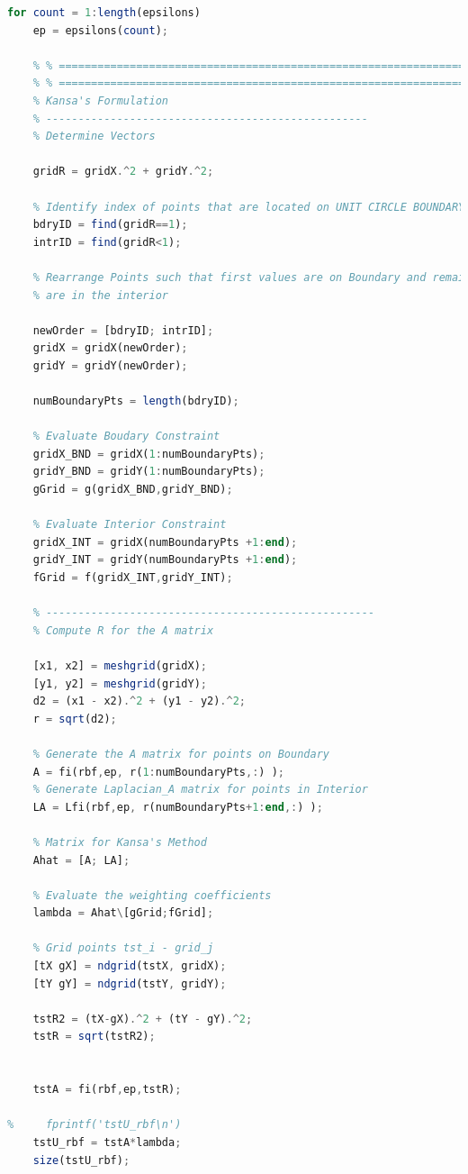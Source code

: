 \documentclass[11pt]{article}
\begin{document}
\begin{lstlisting}[language=octave]
for count = 1:length(epsilons)
    ep = epsilons(count);
   
    % % =======================================================================
    % % =======================================================================
    % Kansa's Formulation
    % --------------------------------------------------
    % Determine Vectors
    
    gridR = gridX.^2 + gridY.^2;
    
    % Identify index of points that are located on UNIT CIRCLE BOUNDARY
    bdryID = find(gridR==1);
    intrID = find(gridR<1);
    
    % Rearrange Points such that first values are on Boundary and remaining
    % are in the interior
    
    newOrder = [bdryID; intrID];
    gridX = gridX(newOrder);
    gridY = gridY(newOrder); 
    
    numBoundaryPts = length(bdryID);
    
    % Evaluate Boudary Constraint
    gridX_BND = gridX(1:numBoundaryPts);
    gridY_BND = gridY(1:numBoundaryPts);
    gGrid = g(gridX_BND,gridY_BND);
    
    % Evaluate Interior Constraint
    gridX_INT = gridX(numBoundaryPts +1:end);
    gridY_INT = gridY(numBoundaryPts +1:end);
    fGrid = f(gridX_INT,gridY_INT);
        
    % ---------------------------------------------------
    % Compute R for the A matrix
    
    [x1, x2] = meshgrid(gridX);
    [y1, y2] = meshgrid(gridY);
    d2 = (x1 - x2).^2 + (y1 - y2).^2;
    r = sqrt(d2);
    
    % Generate the A matrix for points on Boundary
    A = fi(rbf,ep, r(1:numBoundaryPts,:) );
    % Generate Laplacian_A matrix for points in Interior
    LA = Lfi(rbf,ep, r(numBoundaryPts+1:end,:) );
    
    % Matrix for Kansa's Method
    Ahat = [A; LA];
    
    % Evaluate the weighting coefficients
    lambda = Ahat\[gGrid;fGrid];
    
    % Grid points tst_i - grid_j
    [tX gX] = ndgrid(tstX, gridX);
    [tY gY] = ndgrid(tstY, gridY);
    
    tstR2 = (tX-gX).^2 + (tY - gY).^2;
    tstR = sqrt(tstR2);
    
    
    tstA = fi(rbf,ep,tstR);
    
%     fprintf('tstU_rbf\n')
    tstU_rbf = tstA*lambda;
    size(tstU_rbf);
    

\end{lstlisting}
\end{document}
